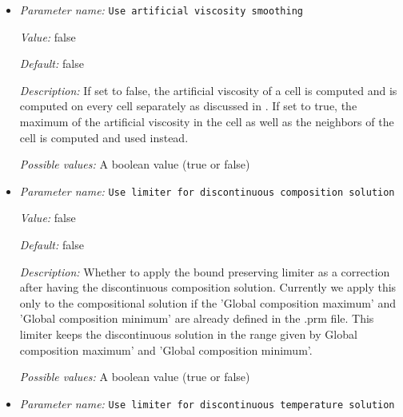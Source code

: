 \begin{itemize}
{\it Possible values:} A floating point number $v$ such that $-\text{MAX\_DOUBLE} \leq v \leq \text{MAX\_DOUBLE}$
\item {\it Parameter name:} {\tt Use artificial viscosity smoothing}
\label{parameters:Discretization/Stabilization parameters/Use artificial viscosity smoothing}
\label{parameters:Discretization/Stabilization_20parameters/Use_20artificial_20viscosity_20smoothing}


{\it Value:} false


{\it Default:} false


{\it Description:} If set to false, the artificial viscosity of a cell is computed and is computed on every cell separately as discussed in \cite{KHB12}. If set to true, the maximum of the artificial viscosity in the cell as well as the neighbors of the cell is computed and used instead.


{\it Possible values:} A boolean value (true or false)
\item {\it Parameter name:} {\tt Use limiter for discontinuous composition solution}
\label{parameters:Discretization/Stabilization parameters/Use limiter for discontinuous composition solution}
\label{parameters:Discretization/Stabilization_20parameters/Use_20limiter_20for_20discontinuous_20composition_20solution}


{\it Value:} false


{\it Default:} false


{\it Description:} Whether to apply the bound preserving limiter as a correction after having the discontinuous composition solution. Currently we apply this only to the compositional solution if the 'Global composition maximum' and 'Global composition minimum' are already defined in the .prm file. This limiter keeps the discontinuous solution in the range given by Global composition maximum' and 'Global composition minimum'.


{\it Possible values:} A boolean value (true or false)
\item {\it Parameter name:} {\tt Use limiter for discontinuous temperature solution}
\label{parameters:Discretization/Stabilization parameters/Use limiter for discontinuous temperature solution}
\label{parameters:Discretization/Stabilization_20parameters/Use_20limiter_20for_20discontinuous_20temperature_20solution}



\end{itemize}
